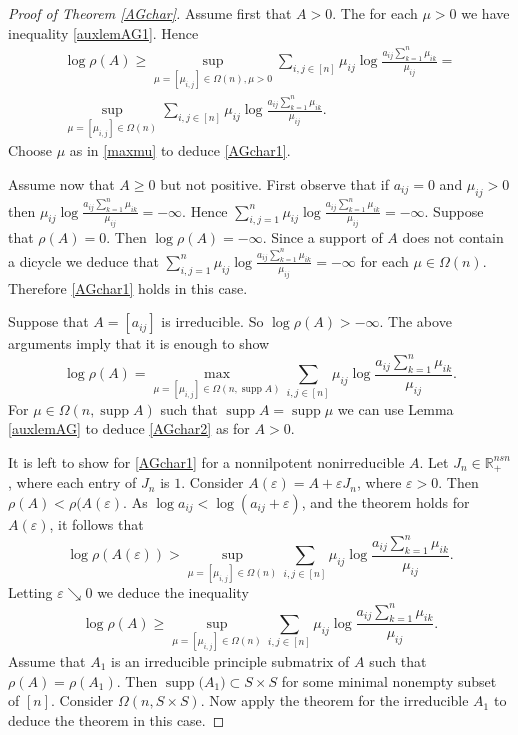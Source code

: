 \documentclass{amsart}
\newcommand{\supp}[1]{\operatorname{supp}{#1}}
\newcommand{\R}{\mathbb{R}}
\newcommand{\0}{\mathbf{0}}
\newcommand{\1}{\mathbf{1}}
\theoremstyle{remark}
\numberwithin{equation}{section} %
\renewcommand{\ge}{\geqslant}
\begin{document}
\begin{proof}[Proof of Theorem \ref{AGchar}]  Assume first that $A>0$.  The for each $\mu>0$ we have inequality \eqref{auxlemAG1}.  Hence
\begin{eqnarray*}
\log\rho(A)\ge\sup_{\mu=[\mu_{i,j}]\in\Omega(n), \mu>0} \sum_{i,j\in[n]} \mu_{ij}\log \frac{a_{ij}\sum_{k=1}^n \mu_{ik}}{\mu_{ij}}=\\ \sup_{\mu=[\mu_{i,j}]\in\Omega(n)} \sum_{i,j\in[n]} \mu_{ij}\log \frac{a_{ij}\sum_{k=1}^n \mu_{ik}}{\mu_{ij}}.
\end{eqnarray*}
Choose $\mu$ as in \eqref{maxmu} to deduce \eqref{AGchar1}.

Assume now that $A\ge 0$ but not positive. 
First observe that if $a_{ij}=0$ and $\mu_{ij}>0$ then 
$\mu_{ij}\log\frac{a_{ij}\sum_{k=1}^n\mu_{ik}}{\mu_{ij}}=-\infty$.  Hence $\sum_{i,j=1}^n 
\mu_{ij}\log\frac{a_{ij}\sum_{k=1}^n\mu_{ik}}{\mu_{ij}}=-\infty$. 
Suppose that $\rho(A)=0$.  Then $\log\rho(A)=-\infty$.  Since a support of $A$ does not contain a dicycle we deduce that $\sum_{i,j=1}^n 
\mu_{ij}\log\frac{a_{ij}\sum_{k=1}^n\mu_{ik}}{\mu_{ij}}=-\infty$ for each $\mu\in\Omega(n)$.  Therefore \eqref{AGchar1} holds in this case.

Suppose that $A=[a_{ij}]$ is irreducible.  So $\log\rho(A)>-\infty$.  The above arguments imply that it is enough to show
\begin{equation}\label{AGchar2}
\log\rho(A)=\max_{\mu=[\mu_{i,j}]\in\Omega(n,\supp{A})} \sum_{i,j\in[n]} \mu_{ij}\log \frac{a_{ij}\sum_{k=1}^n \mu_{ik}}{\mu_{ij}}.
\end{equation}
For $\mu\in\Omega(n,\supp{A})$ such that $\supp{A}=\supp{\mu}$ we can use Lemma \ref{auxlemAG} to deduce \eqref{AGchar2} as for $A>0$.  

It is left to show for \eqref{AGchar1}  for a nonnilpotent nonirreducible $A$.
Let $J_n\in\R^{ns n}_+$, where each entry of $J_n$ is $1$.  Consider $A(\varepsilon)=A+\varepsilon J_n$, where $\varepsilon>0$.  Then $\rho(A)<\rho(A(\varepsilon)$.  As $\log a_{ij}<\log(a_{ij}+\varepsilon)$, and the theorem holds for $A(\varepsilon)$, it follows that
\[\log\rho(A(\varepsilon)) >\sup_{\mu=[\mu_{i,j}]\in\Omega(n)} \sum_{i,j\in[n]} \mu_{ij}\log \frac{a_{ij}\sum_{k=1}^n \mu_{ik}}{\mu_{ij}}.\]
Letting $\varepsilon\searrow 0$ we deduce the inequality 
\[\log\rho(A)\ge\sup_{\mu=[\mu_{i,j}]\in\Omega(n)} \sum_{i,j\in[n]} \mu_{ij}\log \frac{a_{ij}\sum_{k=1}^n \mu_{ik}}{\mu_{ij}}.\] 
Assume that $A_1$ is an irreducible principle submatrix of $A$ such that $\rho(A)=\rho(A_1)$.  Then $\supp (A_1)\subset S\times S$ for some minimal nonempty subset of $[n]$.  Consider $\Omega(n,S\times S)$.  Now apply the theorem for the irreducible $A_1$ to deduce the theorem in this case.\end{proof}
\end{document}

